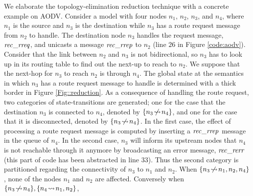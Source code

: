We elaborate the topology-elimination reduction technique with a concrete example on AODV. Consider a model with four nodes $n_1$, $n_2$, $n_3$, and $n_4$, where $n_1$ is the source and $n_3$ is the destination while $n_3$ has a route request message from $n_2$ to handle. %
The destination node $n_3$ handles the request message, ${\it rec\_rreq}$, and unicasts a message ${\it rec\_rrep}$ to $n_2$ (line $26$ in Figure \ref{code:aodv}). Consider that the link between $n_2$ and $n_3$ is not bidirectional, so $n_3$ has to look up in its routing table to find out the next-up to reach to $n_2$. We suppose that the next-hop for $n_3$ to reach $n_2$ is through $n_4$. The global state at the semantics in which $n_3$ has a route request message to handle is determined with a thick border in Figure \ref{Fig::reduction}. As a consequence of handling the route request, two categories of state-transitions are generated; one for the case that the destination $n_3$ is connected to $n_4$, denoted by $\{n_3\!\mathrel{\hspace{.1em}\not\hspace{-.1em}\rightsquigarrow}\! n_4\}$, and one for the case that it is disconnected, denoted by $\{n_3\!\mathrel{\hspace{.1em}\not\hspace{-.1em}\rightsquigarrow}\! n_4\}$. In the first case, %
the effect of processing a route request message is computed by inserting a ${\it rec\_rrep}$ message in the queue of $n_4$. In the second case, $n_3$ will inform its upstream nodes that $n_4$ is not reachable through it anymore by broadcasting an error message, ${\it rec\_rerr}$ (this part of code has been abstracted in line $33$). %
Thus the second category is partitioned regarding the connectivity of $n_3$ to $n_1$ and $n_2$. When $\{n_3\!\mathrel{\hspace{.1em}\not\hspace{-.1em}\rightsquigarrow}\! n_1,n_2,n_4\}$, %
none of the nodes $n_1$ and $n_2$ are affected. Conversely when $\{n_3\!\mathrel{\hspace{.1em}\not\hspace{-.1em}\rightsquigarrow}\! n_4\},\{n_4\!\rightsquigarrow\! n_1,n_2\}$, %
